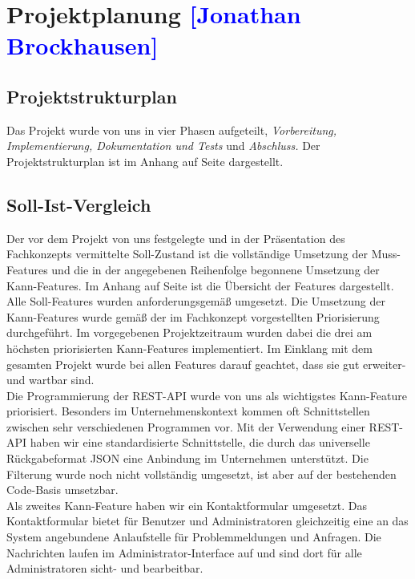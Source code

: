 

\section{Projektplanung \textcolor{blue}{[Jonathan Brockhausen]}}

\subsection{Projektstrukturplan}
Das Projekt wurde von uns in vier Phasen aufgeteilt, \textit{Vorbereitung, Implementierung, \glqq{}Dokumentation und Tests\grqq{}} und \textit{Abschluss.}
Der Projektstrukturplan ist im Anhang auf Seite \pageref{PSP} dargestellt.

\subsection{Soll-Ist-Vergleich}
Der vor dem Projekt von uns festgelegte und in der Präsentation des Fachkonzepts vermittelte Soll-Zustand ist die vollständige Umsetzung der Muss-Features und die in der angegebenen Reihenfolge begonnene Umsetzung der Kann-Features.
Im Anhang auf Seite \pageref{PM_SOLLIST} ist die Übersicht der Features dargestellt. Alle Soll-Features wurden anforderungsgemäß umgesetzt. Die Umsetzung der Kann-Features wurde gemäß der im Fachkonzept vorgestellten Priorisierung durchgeführt. Im vorgegebenen Projektzeitraum wurden dabei die drei am höchsten priorisierten Kann-Features implementiert. Im Einklang mit dem gesamten Projekt wurde bei allen Features darauf geachtet, dass sie gut erweiter- und wartbar sind.\\
Die Programmierung der REST-API wurde von uns als wichtigstes Kann-Feature priorisiert. Besonders im Unternehmenskontext kommen oft Schnittstellen zwischen sehr verschiedenen Programmen vor. Mit der Verwendung einer REST-API haben wir eine standardisierte Schnittstelle, die durch das universelle Rückgabeformat JSON eine Anbindung im Unternehmen unterstützt. Die Filterung wurde noch nicht vollständig umgesetzt, ist aber auf der bestehenden Code-Basis umsetzbar.\\
Als zweites Kann-Feature haben wir ein Kontaktformular umgesetzt. Das Kontaktformular bietet für Benutzer und Administratoren gleichzeitig eine an das System angebundene Anlaufstelle für Problemmeldungen und Anfragen. Die Nachrichten laufen im Administrator-Interface auf und sind dort für alle Administratoren sicht- und bearbeitbar.\\
